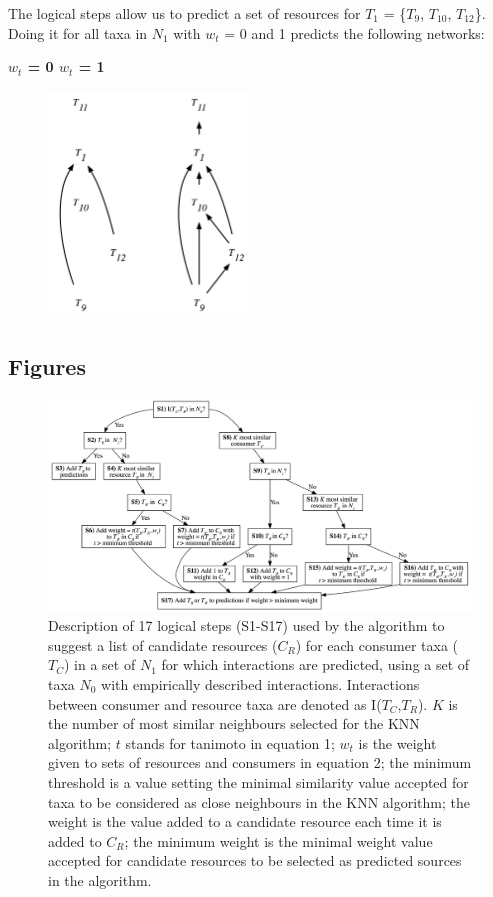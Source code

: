 The logical steps allow us to predict a set of resources for $T_1$ = \{$T_9$, $T_{10}$, $T_{12}$\}. Doing it for all taxa in $N_1$ with $w_t$ = 0 and 1 predicts the following networks:
\bigskip

\centerline{\textbf{$w_t$ = 0 \quad \quad \quad \quad \quad $w_t$ = 1} \quad}
    \begin{figure}[h!]
    \centering\includegraphics[height = 6cm]{./chapitre3/figures/example.png}
    \end{figure}


\newpage
\subsection{Figures}
    \begin{figure}[h]
      \centering\includegraphics[width=\textwidth]{./chapitre3/figures/Decision_Diagram.png}
      \caption{Description of 17 logical steps (S1-S17) used by the algorithm to suggest a list of candidate resources ($C_R$) for each consumer taxa ($T_C$) in a set of $N_1$ for which interactions are predicted, using a set of taxa $N_0$ with empirically described interactions. Interactions between consumer and resource taxa are denoted as I($T_C$,$T_R$). $K$ is the number of most similar neighbours selected for the KNN algorithm; $t$ stands for tanimoto in equation 1; $w_t$ is the weight given to sets of resources and consumers in equation 2; the minimum threshold is a value setting the minimal similarity value accepted for taxa to be considered as close neighbours in the KNN algorithm; the weight is the value added to a candidate resource each time it is added to $C_R$; the minimum weight is the minimal weight value accepted for candidate resources to be selected as predicted sources in the algorithm.}
      \label{fig:decision_diag}
\end{figure}

